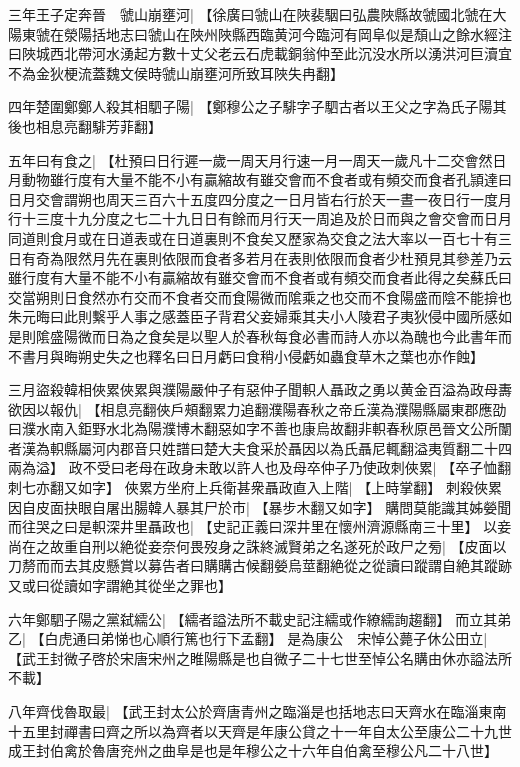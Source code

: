 \par
三年王子定奔晉　虢山崩壅河|{
	【徐廣曰虢山在陜裴駰曰弘農陜縣故虢國北虢在大陽東虢在滎陽括地志曰虢山在陜州陜縣西臨黄河今臨河有岡阜似是頹山之餘水經注曰陜城西北帶河水湧起方數十丈父老云石虎載銅翁仲至此沉没水所以湧洪河巨瀆宜不為金狄梗流蓋魏文侯時虢山崩壅河所致耳陜失冉翻】}
\par
四年楚圍鄭鄭人殺其相駟子陽|{
	【鄭穆公之子騑字子駟古者以王父之字為氏子陽其後也相息亮翻騑芳菲翻】}
\par
五年曰有食之|{
	【杜預曰日行遲一歲一周天月行速一月一周天一歲凡十二交會然日月動物雖行度有大量不能不小有贏縮故有雖交會而不食者或有頻交而食者孔頴達曰日月交會謂朔也周天三百六十五度四分度之一日月皆右行於天一晝一夜日行一度月行十三度十九分度之七二十九日日有餘而月行天一周追及於日而與之會交會而日月同道則食月或在日道表或在日道裏則不食矣又歷家為交食之法大率以一百七十有三日有奇為限然月先在裏則依限而食者多若月在表則依限而食者少杜預見其參差乃云雖行度有大量不能不小有贏縮故有雖交會而不食者或有頻交而食者此得之矣蘇氏曰交當朔則日食然亦冇交而不食者交而食陽微而隂乘之也交而不食陽盛而陰不能揜也朱元晦曰此則繫乎人事之感蓋臣子背君父妾婦乘其夫小人陵君子夷狄侵中國所感如是則隂盛陽微而日為之食矣是以聖人於春秋每食必書而詩人亦以為醜也今此書年而不書月與晦朔史失之也釋名曰日月虧曰食稍小侵虧如蟲食草木之葉也亦作蝕】}
\par
三月盜殺韓相俠累俠累與濮陽嚴仲子有惡仲子聞軹人聶政之勇以黄金百溢為政母夀欲因以報仇|{
	【相息亮翻俠戶頰翻累力追翻濮陽春秋之帝丘漢為濮陽縣屬東郡應劭曰濮水南入鉅野水北為陽濮博木翻惡如字不善也康烏故翻非軹春秋原邑晉文公所闈者漢為軹縣屬河内郡音只姓譜曰楚大夫食采於聶因以為氏聶尼輒翻溢夷質翻二十四兩為溢】}
政不受曰老母在政身未敢以許人也及母卒仲子乃使政刺俠累|{
	【卒子恤翻刺七亦翻又如字】}
俠累方坐府上兵衛甚衆聶政直入上階|{
	【上時掌翻】}
刺殺俠累因自皮面抉眼自屠出腸韓人暴其尸於市|{
	【暴步木翻又如字】}
購問莫能識其姊嫈聞而往哭之曰是軹深井里聶政也|{
	【史記正義曰深井里在懷州濟源縣南三十里】}
以妾尚在之故重自刑以絶從妾奈何畏歿身之誅終滅賢弟之名遂死於政尸之㫄|{
	【皮面以刀剺而而去其皮懸賞以募告者曰購購古候翻嫈烏莖翻絶從之從讀曰蹤謂自絶其蹤跡又或曰從讀如字謂絶其從坐之罪也】}
\par
六年鄭駟子陽之黨弑繻公|{
	【繻者謚法所不載史記注繻或作繚繻詢趨翻】}
而立其弟乙|{
	【白虎通曰弟悌也心順行篤也行下孟翻】}
是為康公　宋悼公薨子休公田立|{
	【武王封微子啓於宋唐宋州之睢陽縣是也自微子二十七世至悼公名購由休亦謚法所不載】}
\par
八年齊伐魯取最|{
	【武王封太公於齊唐青州之臨淄是也括地志曰天齊水在臨淄東南十五里封禪書曰齊之所以為齊者以天齊是年康公貸之十一年自太公至康公二十九世成王封伯禽於魯唐兖州之曲阜是也是年穆公之十六年自伯禽至穆公凡二十八世】}
